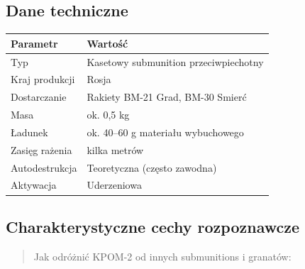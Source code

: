 \documentclass[12pt,oneside]{book}
\begin{document}
\subsection{Dane techniczne}\label{dane-techniczne-132}

\begin{longtable}[]{@{}ll@{}}
\toprule\noalign{}
Parametr & Wartość \\
\midrule\noalign{}
\endhead
\bottomrule\noalign{}
\endlastfoot
Typ & Kasetowy submunition przeciwpiechotny \\
Kraj produkcji & Rosja \\
Dostarczanie & Rakiety BM-21 Grad, BM-30 Smierć \\
Masa & ok. 0,5 kg \\
Ładunek & ok. 40--60 g materiału wybuchowego \\
Zasięg rażenia & kilka metrów \\
Autodestrukcja & Teoretyczna (często zawodna) \\
Aktywacja & Uderzeniowa \\
\end{longtable}

\subsection{Charakterystyczne cechy
rozpoznawcze}\label{charakterystyczne-cechy-rozpoznawcze-132}

\begin{quote}
Jak odróżnić KPOM-2 od innych submunitions i granatów:
\end{quote}
\end{document}
